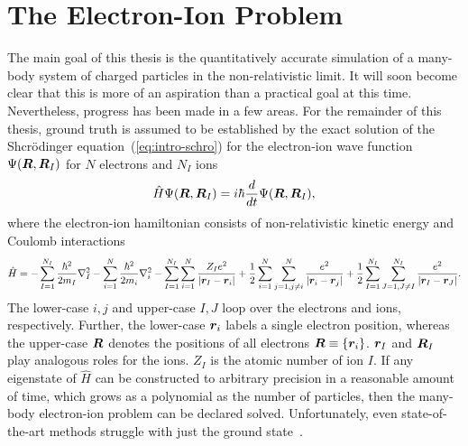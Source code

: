 \begin{comment}
Density matrix
\begin{align}
\rho\propto\exp\left(i\dfrac{S}{\hbar}\right)
\end{align}
\end{comment}

\section{The Electron-Ion Problem}
The main goal of this thesis is the quantitatively accurate simulation of a many-body system of charged particles in the non-relativistic limit.
It will soon become clear that this is more of an aspiration than a practical goal at this time.
Nevertheless, progress has been made in a few areas.
For the remainder of this thesis, ground truth is assumed to be established by the exact solution of the Shcr\"odinger equation~(\ref{eq:intro-schro}) for the electron-ion wave function $\Psi(\boldsymbol{R},\boldsymbol{R}_I)$ for $N$ electrons and $N_I$ ions
\begin{align} \label{eq:intro-schro}
\hat{H} \Psi(\boldsymbol{R},\boldsymbol{R}_I) = i\hbar\frac{d}{dt}\Psi(\boldsymbol{R},\boldsymbol{R}_I),
\end{align}
where the electron-ion hamiltonian consists of non-relativistic kinetic energy and Coulomb interactions
\begin{align} \label{eq:intro-ei-ham}
\hat{H} =
-\sum\limits_{I=1}^{N_I} \frac{\hbar^2}{2m_I} \nabla^2_I
-\sum\limits_{i=1}^N \frac{\hbar^2}{2m_i}\nabla^2_i
-\sum\limits_{I=1}^{N_I}\sum\limits_{i=1}^N
\frac{Z_Ie^2}{\vert\boldsymbol{r}_I-\boldsymbol{r}_i\vert}
+\frac{1}{2}\sum\limits_{i=1}^N\sum\limits_{j=1,j\neq i}^{N} \frac{e^2}{\vert\boldsymbol{r}_i-\boldsymbol{r}_j\vert}
+\frac{1}{2}\sum\limits_{I=1}^{N_I}\sum\limits_{J=1,J\neq I}^{N_I} \frac{e^2}{\vert\boldsymbol{r}_I-\boldsymbol{r}_J\vert}.
\end{align}
The lower-case $i,j$ and upper-case $I,J$ loop over the electrons and ions, respectively. Further, the lower-case $\boldsymbol{r}_i$ labels a single electron position, whereas the upper-case $\boldsymbol{R}$ denotes the positions of all electrons $\boldsymbol{R}\equiv\{\boldsymbol{r}_i\}$. $\boldsymbol{r}_I$ and $\boldsymbol{R}_I$ play analogous roles for the ions. $Z_I$ is the atomic number of ion $I$. If any eigenstate of $\hat{H}$ can be constructed to arbitrary precision in a reasonable amount of time, which grows as a polynomial as the number of particles, then the many-body electron-ion problem can be declared solved. Unfortunately, even state-of-the-art methods struggle with just the ground state~\cite{Azadi2014,McMinis2015,Drummond2015}.

